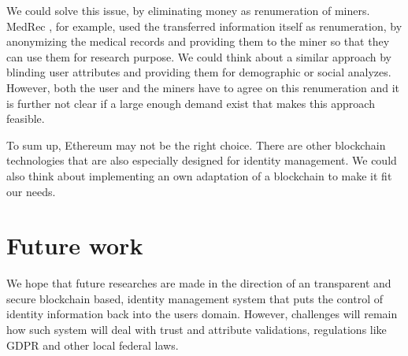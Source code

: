 We could solve this issue, by eliminating money as renumeration of miners. MedRec \cite{azaria2016medrec}, for example, used the transferred information itself as renumeration, by anonymizing the medical records and providing them to the miner so that they can use them for research purpose. We could think about a similar approach by blinding user attributes and providing them for demographic or social analyzes. However, both the user and the miners have to agree on this renumeration and it is further not clear if a large enough demand exist that makes this approach feasible.

To sum up, Ethereum may not be the right choice. There are other blockchain technologies that are also especially designed for identity management. We could also think about implementing an own adaptation of a blockchain to make it fit our needs. 

\section{Future work}
We hope that future researches are made in the direction of an transparent and secure blockchain based, identity management system that puts the control of identity information back into the users domain. However, challenges will remain how such system will deal with trust and attribute validations, regulations like GDPR and other local federal laws.
